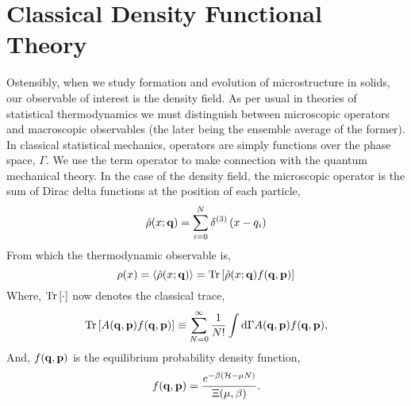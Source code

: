 \section{Classical Density Functional Theory}  %

Ostensibly, when we study formation and evolution of microstructure in solids,
our observable of interest is the density field.  As per usual in theories of
statistical thermodynamics we must distinguish between microscopic operators
and macroscopic observables (the later being the ensemble average of the
former).  In classical statistical mechanics, operators are simply functions
over the phase space, $\Gamma$.  We use the term operator to make connection
with the quantum mechanical theory.  In the case of the density field, the
microscopic operator is the sum of Dirac delta functions at the position of each
particle,
%
\begin{equation} 
    \hat{\rho}(x; \mathbf{q}) = \sum_{i = 0}^N \delta^{(3)}\left(x - q_i\right)
\end{equation}
%
From which the thermodynamic observable is, 
%
\begin{equation} 
    \label{mean_density} 
    \rho(x) = \left\langle \hat{\rho}(x; \mathbf{q}) \right\rangle = 
        \mathrm{Tr}\left[ \hat{\rho}(x; \mathbf{q}) f(\mathbf{q}, \mathbf{p}) \right]
\end{equation}
%
Where, $\mathrm{Tr}\left[ \cdot \right]$ now denotes the classical trace,
%
\begin{equation}
    \mathrm{Tr}\left[ A(\mathbf{q}, \mathbf{p}) f(\mathbf{q}, \mathbf{p}) \right] \equiv \sum_{N =0}^\infty
        \frac{1}{N!}\int\mathrm{d}\Gamma A(\mathbf{q}, \mathbf{p}) f(\mathbf{q}, \mathbf{p}), 
\end{equation}
%
And, $f(\mathbf{q}, \mathbf{p})$ is the equilibrium probability density function,
%
\begin{equation} 
    f(\mathbf{q}, \mathbf{p}) = \frac{e^{-\beta (\mathcal{H} - \mu N)}}{\Xi(\mu, \beta)}.
\end{equation}
%

